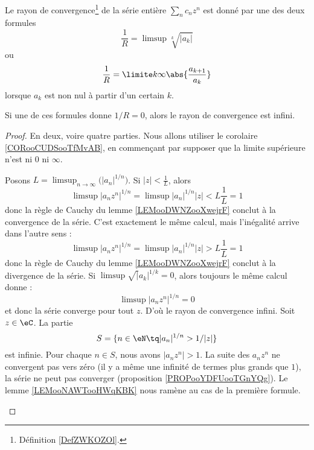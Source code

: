\begin{theorem} \label{ThoSerPuissRap}
	Le rayon de convergence\footnote{Définition \ref{DefZWKOZOl}.} de la série entière \( \sum_n c_n z^n\) est donné par une des deux formules
	\begin{equation}		\label{EqRayCOnvSer}
		\frac{1}{ R } =\limsup\sqrt[k]{| a_k |}
	\end{equation}
	ou
	\begin{equation}		\label{EqAlphaSerPuissAtern}
		\frac{1}{ R }=\limite k \infty \abs{\frac{a_{k+1}}{a_k}}
	\end{equation}
	lorsque \( a_k\) est non nul à partir d'un certain \( k\).

	Si une de ces formules donne \( 1/R=0\), alors le rayon de convergence est infini.
\end{theorem}

\begin{proof}
	En deux, voire quatre parties. Nous allons utiliser le corolaire \ref{CORooCUDSooTfMvAB}, en commençant par supposer que la limite supérieure n'est ni \( 0\) ni \( \infty\).
	\begin{subproof}
		Posons \( L=\limsup_{n\to \infty}\big( | a_n |^{1/n} \big)\). Si \( | z |<\frac{1}{ L }\), alors
		\begin{equation}
			\limsup| a_nz^n |^{1/n}= \limsup| a_n |^{1/n}| z |
			<L\frac{1}{ L }
			=1
		\end{equation}
		donc la règle de Cauchy du lemme \ref{LEMooDWNZooXwejrF} conclut à la convergence de la série.
		C'est exactement le même calcul, mais l'inégalité arrive dans l'autre sens :
		\begin{equation}
			\limsup| a_nz^n |^{1/n}= \limsup| a_n |^{1/n}| z |
			>L\frac{1}{ L }
			=1
		\end{equation}
		donc la règle de Cauchy du lemme \ref{LEMooDWNZooXwejrF} conclut à la divergence de la série.
		Si \( \limsup\sqrt| a_k |^{1/k}=0\), alors toujours le même calcul donne :
		\begin{equation}
			\limsup| a_nz^n |^{1/n}=0
		\end{equation}
		et donc la série converge pour tout \( z\). D'où le rayon de convergence infini.
		Soit \( z\in \eC\). La partie
		\begin{equation}
			S=\{ n\in \eN\tq | a_n |^{1/n}>1/| z | \}
		\end{equation}
		est infinie. Pour chaque \( n\in S\), nous avons \( | a_n z^n |>1\). La suite des \( a_nz^n\) ne convergent pas vers zéro (il y a même une infinité de termes plus grands que \( 1\)), la série ne peut pas converger (proposition \ref{PROPooYDFUooTGnYQg}).
		Le lemme \ref{LEMooNAWTooHWqKBK} nous ramène au cas de la première formule.
	\end{subproof}
\end{proof}

